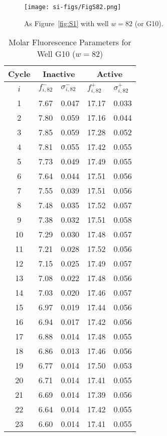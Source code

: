                 \begin{figure}
                    \centering
                    \texttt{[image: si-figs/FigS82.png]}
                    \caption{
                        As Figure~\ref{fig:S1} with well $w=82$ (or G10).
                    }
                \end{figure}
                \clearpage
    \begin{table}
        \caption{Molar Fluorescence Parameters for Well G10 ($w=82$)}
        \centering
        \begin{tabular}{c|ll|ll}
            Cycle & \multicolumn{2}{c|}{Inactive} & \multicolumn{2}{c}{Active} \\
            \hline
            $i$ & $f_{i,82}^{-}$ & $\sigma_{i,82}^{-}$ &  $f_{i,82}^{+}$ & $\sigma_{i,82}^{+}$ \\
            \hline
    1 & 7.67 & 0.047 & 17.17 & 0.033 \\
2 & 7.80 & 0.059 & 17.16 & 0.044 \\
3 & 7.85 & 0.059 & 17.28 & 0.052 \\
4 & 7.81 & 0.055 & 17.42 & 0.055 \\
5 & 7.73 & 0.049 & 17.49 & 0.055 \\
6 & 7.64 & 0.044 & 17.51 & 0.056 \\
7 & 7.55 & 0.039 & 17.51 & 0.056 \\
8 & 7.48 & 0.035 & 17.52 & 0.057 \\
9 & 7.38 & 0.032 & 17.51 & 0.058 \\
10 & 7.29 & 0.030 & 17.48 & 0.057 \\
11 & 7.21 & 0.028 & 17.52 & 0.056 \\
12 & 7.15 & 0.025 & 17.49 & 0.057 \\
13 & 7.08 & 0.022 & 17.48 & 0.056 \\
14 & 7.03 & 0.020 & 17.46 & 0.057 \\
15 & 6.97 & 0.019 & 17.44 & 0.056 \\
16 & 6.94 & 0.017 & 17.42 & 0.056 \\
17 & 6.88 & 0.014 & 17.48 & 0.055 \\
18 & 6.86 & 0.013 & 17.46 & 0.056 \\
19 & 6.77 & 0.014 & 17.50 & 0.053 \\
20 & 6.71 & 0.014 & 17.41 & 0.055 \\
21 & 6.69 & 0.014 & 17.39 & 0.056 \\
22 & 6.64 & 0.014 & 17.42 & 0.055 \\
23 & 6.60 & 0.014 & 17.41 & 0.055 \\

\end{tabular}
\end{table}
